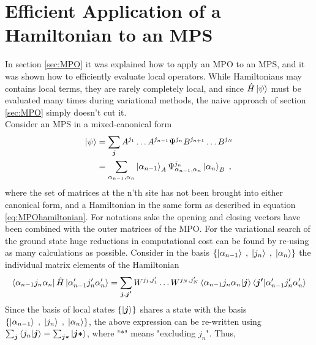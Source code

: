 \section{Efficient Application of a Hamiltonian to an MPS}
In section \ref{sec:MPO} it was explained how to apply an MPO to an MPS, and it was shown how to efficiently evaluate local operators. While Hamiltonians may contains local terms, they are rarely completely local, and since $\hat{H} \ket{\psi}$ must be evaluated many times during variational methods, the naive approach of section \ref{sec:MPO} simply doesn't cut it.\\
Consider an MPS in a mixed-canonical form
\begin{align}
	\ket{\psi} &= \sum_{\boldsymbol{j}} A^{j_1} \ldots A^{j_{n-1}} \Psi^{j_n} B^{j_{n+1}} \ldots B^{j_{N}} \nonumber \\
	&= \sum_{\alpha_{n-1} , \alpha_{n}} \ket{\alpha_{n-1}}_A \Psi_{\alpha_{n-1} , \alpha_{n}}^{j_n}  \ket{\alpha_{n}}_B \; ,
	\label{eq:MPSmixedsingle}
\end{align}
where the set of matrices at the n'th site has not been brought into either canonical form, and a Hamiltonian in the same form as described in equation \ref{eq:MPOhamiltonian}. For notations sake the opening and closing vectors have been combined with the outer matrices of the MPO.
For the variational search of the ground state huge reductions in computational cost can be found by re-using as many calculations as possible. Consider in the basis $\{ \ket{\alpha_{n-1} } \; , \; \ket{ j_n } \; , \; \ket{\alpha_{n} } \}$ the individual matrix elements of the Hamiltonian
\begin{equation*}
	\bra{\alpha_{n-1} j_n \alpha_{n}} \hat{H} \ket{\alpha_{n-1} ' j_n ' \alpha_{n} '} = \sum_{\boldsymbol{j} , \boldsymbol{j'}}  W^{j_1 , j_1 '} \ldots W^{j_N , j_N '}  \braket{\alpha_{n-1} j_n \alpha_{n} | \boldsymbol{j}} \braket{\boldsymbol{j'} | \alpha_{n-1} ' j_n ' \alpha_{n} '} 
\end{equation*}
Since the basis of local states $\{ \ket{\boldsymbol{j}} \}$ shares a state with the basis $\{ \ket{\alpha_{n-1} } \; , \; \ket{ j_n } \; , \; \ket{\alpha_{n} } \}$, the above expression can be re-written using $\sum_{\boldsymbol{j}} \braket{j_n | \boldsymbol{j}} = \sum_{\boldsymbol{j *}} \ket{ \boldsymbol{j *}}$, where "$\boldsymbol{*}$" means "excluding $j_n$". Thus,
